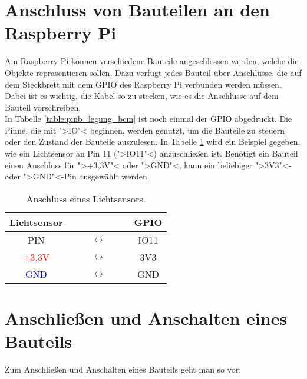 \documentclass[11pt, a4paper]{article}
\begin{document}
\section*{Anschluss von Bauteilen an den Raspberry Pi}

Am Raspberry Pi können verschiedene Bauteile angeschlossen werden, welche die Objekte repräsentieren sollen. Dazu verfügt jedes Bauteil über Anschlüsse, die auf dem Steckbrett mit dem GPIO des Raspberry Pi verbunden werden müssen. Dabei ist es wichtig, die Kabel so zu stecken, wie es die Anschlüsse auf dem Bauteil vorschreiben.\\

In Tabelle \ref{table:pinb_legung_bcm} ist noch einmal der GPIO abgedruckt. Die Pinne, die mit ">IO"< beginnen, werden genutzt, um die Bauteile zu steuern oder den Zustand der Bauteile auszulesen. In Tabelle \ref{table:anschluss_lichtsensor} wird ein Beispiel gegeben, wie ein Lichtsensor an Pin 11 (">IO11"<) anzuschließen ist. Benötigt ein Bauteil einen Anschluss für ">+3,3V"< oder ">GND"<, kann ein beliebiger ">3V3"<- oder ">GND"<-Pin ausgewählt werden.\\

\begin{table}[htbp]
  \centering
  \begin{tabular}{@{} ccc @{}}
    \toprule
    Lichtsensor &  & GPIO \\ 
    \midrule
    PIN & $\qquad\longleftrightarrow\qquad$ & IO11 \\ 
    \textcolor{red}{+3,3V} & $\longleftrightarrow$ & 3V3 \\ 
    \textcolor{blue}{GND} & $\longleftrightarrow$ & GND \\ 
    \bottomrule
  \end{tabular}
  \caption{Anschluss eines Lichtsensors.}
  \label{table:anschluss_lichtsensor}
\end{table}

\section*{Anschließen und Anschalten eines Bauteils}
Zum Anschließen und Anschalten eines Bauteils geht man so vor:
\end{document}
